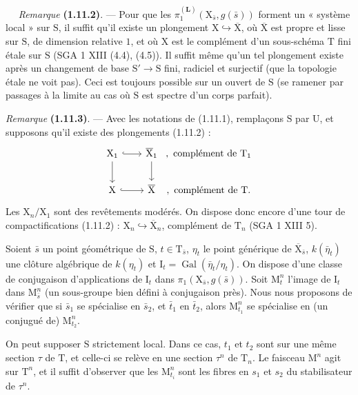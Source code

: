 \documentclass[11pt,leqno]{article}
\newcommand{\Page}[1]{\ifvmode\noindent\else\unskip\ \fi{\footnotesize\textcolor{gray}{[p.\,#1]}}\ \ignorespaces}
\begin{document}
\Page{185}
\textit{Remarque} \textbf{(1.11.2)}. — Pour que les \(\pi_1^{(\mathbf{L})}(\mathrm{X}_{\bar{s}},g(\bar{s}))\) forment un « système local » sur \(\mathrm{S}\), il suffit qu’il existe un plongement \(\mathrm{X}\hookrightarrow\overline{\mathrm{X}}\), où \(\overline{\mathrm{X}}\) est propre et lisse sur \(\mathrm{S}\), de dimension relative \(1\), et où \(\mathrm{X}\) est le complément d’un sous-schéma \(\mathrm{T}\) fini étale sur \(\mathrm{S}\) (SGA 1 XIII (4.4), (4.5)). Il suffit même qu’un tel plongement existe après un changement de base \(\mathrm{S}'\to\mathrm{S}\) fini, radiciel et surjectif (que la topologie étale ne voit pas). Ceci est toujours possible sur un ouvert de \(\mathrm{S}\) (se ramener par passages à la limite au cas où \(\mathrm{S}\) est spectre d’un corps parfait).

\textit{Remarque} \textbf{(1.11.3)}. — Avec les notations de (1.11.1), remplaçons \(\mathrm{S}\) par \(\mathrm{U}\), et supposons qu’il existe des plongements (1.11.2) :
\[
\begin{tikzcd}[column sep=2em,row sep=2em]
\mathrm{X}_1 \arrow[r,hook] \arrow[d]
  & \overline{\mathrm{X}}_1 \arrow[d]
  &[-2em] {,\ \text{complément de }\mathrm{T}_1} \\
\mathrm{X} \arrow[r,hook]
  & \overline{\mathrm{X}}
  &[-2em] {,\ \text{complément de }\mathrm{T}.}
\end{tikzcd}
\]
Les \(\mathrm{X}_n/\mathrm{X}_1\) sont des revêtements modérés. On dispose donc encore d’une tour de compactifications (1.11.2) : \(\mathrm{X}_n\hookrightarrow\overline{\mathrm{X}}_n\), complément de \(\mathrm{T}_n\) (SGA 1 XIII 5).

Soient \(\bar{s}\) un point géométrique de \(\mathrm{S}\), \(t\in\mathrm{T}_{\bar{s}}\), \(\eta_t\) le point générique de \(\overline{\mathrm{X}}_{\bar{s}}\), \(k(\bar{\eta}_t)\) une clôture algébrique de \(k(\eta_t)\) et \(\mathrm{I}_t=\operatorname{Gal}(\bar{\eta}_t/\eta_t)\). On dispose d’une classe de conjugaison d’applications de \(\mathrm{I}_t\) dans \(\pi_1(\mathrm{X}_{\bar{s}},g(\bar{s}))\). Soit \(\mathrm{M}_t^n\) l’image de \(\mathrm{I}_t\) dans \(\mathrm{M}_{\bar{s}}^n\) (un sous-groupe bien défini à conjugaison près). Nous nous proposons de vérifier que si \(\bar{s}_1\) se spécialise en \(\bar{s}_2\), et \(\bar{t}_1\) en \(\bar{t}_2\), alors \(\mathrm{M}_{t_1}^n\) se spécialise en (un conjugué de) \(\mathrm{M}_{t_2}^n\).

On peut supposer \(\mathrm{S}\) strictement local. Dans ce cas, \(t_1\) et \(t_2\) sont sur une même section \(\tau\) de \(\mathrm{T}\), et celle-ci se relève en une section \(\tau^n\) de \(\mathrm{T}_n\). Le faisceau \(\mathrm{M}^n\) agit sur \(\mathrm{T}^n\), et il suffit d’observer que les \(\mathrm{M}_{t_i}^n\) sont les fibres en \(s_1\) et \(s_2\) du stabilisateur de \(\tau^n\).
\end{document}
